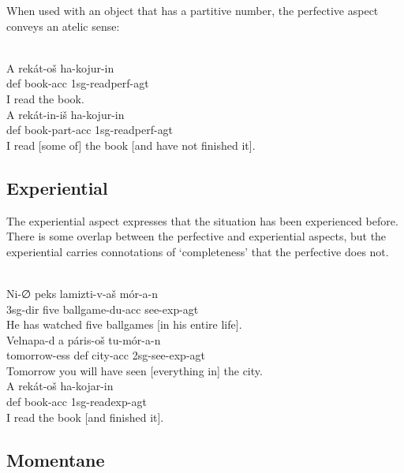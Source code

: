 \documentclass[grammar]{subfiles}
\begin{document}
When used with an object that has a partitive number, the perfective aspect
conveys an atelic sense:

\begin{exe}
  \ex {}\\
  \gll A rekát-oš ha-kojur-in\\
  \acs{def} book-\acs{acc} \acs{1sg}-read\bs\acs{perf}-\acs{agt}\\
  \glt I read the book.
  \ex {}\\
  \gll A rekát-in-iš ha-kojur-in\\
  \acs{def} book-\acs{part}-\acs{acc} \acs{1sg}-read\bs\acs{perf}-\acs{agt}\\
  \glt I read [some of] the book [and have not finished it].
\end{exe}


\subsection{Experiential}
\label{vp:ssec_experiential}

The experiential aspect expresses that the situation has been experienced
before.  There is some overlap between the perfective and experiential aspects,
but the experiential carries connotations of ‘completeness’ that the perfective
does not.   

\begin{exe}
  \ex {}\\
  \gll Ni-∅ peks lamizti-v-aš mór-a-n\\ 
  \acs{3sg}-\acs{dir} five ballgame-\acs{du}-\acs{acc} see-\acs{exp}-\acs{agt}\\
  \glt He has watched five ballgames [in his entire life].
  \ex {}\\
  \gll Velnapa-d a páris-oš tu-mór-a-n\\
  tomorrow-\acs{ess} \acs{def} city-\acs{acc} \acs{2sg}-see-\acs{exp}-\acs{agt}\\
  \glt Tomorrow you will have seen [everything in] the city.
  \ex {}\\
  \gll A rekát-oš ha-kojar-in\\
  \acs{def} book-\acs{acc} \acs{1sg}-read\bs\acs{exp}-\acs{agt}\\
  \glt I read the book [and finished it].
\end{exe}


\subsection{Momentane}
\label{vp:ssec_momentane}
\end{document}
